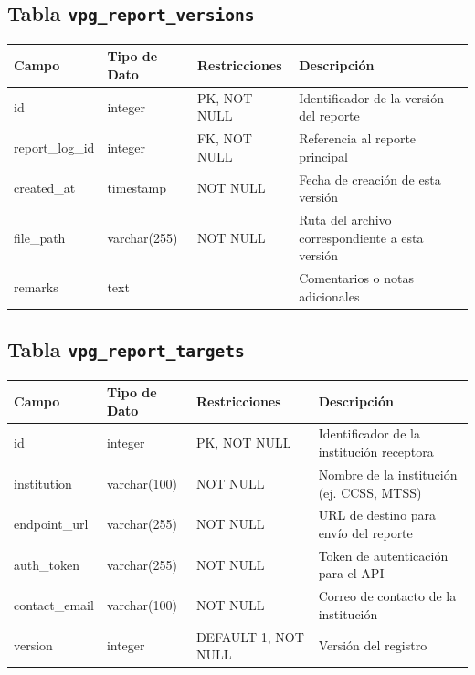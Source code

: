 \begin{center}
	\subsection{Tabla \texttt{vpg\_report\_versions}}
	\small
	\begin{tabular}{|l|l|l|p{6cm}|}
		\hline
		\textbf{Campo}  & \textbf{Tipo de Dato} & \textbf{Restricciones} & \textbf{Descripción}                            \\
		\hline
		id              & integer               & PK, NOT NULL           & Identificador de la versión del reporte         \\
		report\_log\_id & integer               & FK, NOT NULL           & Referencia al reporte principal                 \\
		created\_at     & timestamp             & NOT NULL               & Fecha de creación de esta versión               \\
		file\_path      & varchar(255)          & NOT NULL               & Ruta del archivo correspondiente a esta versión \\
		remarks         & text                  &                        & Comentarios o notas adicionales                 \\
		\hline
	\end{tabular}
	\normalsize

	\subsection{Tabla \texttt{vpg\_report\_targets}}
	\small
	\begin{tabular}{|l|l|l|p{6cm}|}
		\hline
		\textbf{Campo} & \textbf{Tipo de Dato} & \textbf{Restricciones} & \textbf{Descripción}                      \\
		\hline
		id             & integer               & PK, NOT NULL           & Identificador de la institución receptora \\
		institution    & varchar(100)          & NOT NULL               & Nombre de la institución (ej. CCSS, MTSS) \\
		endpoint\_url  & varchar(255)          & NOT NULL               & URL de destino para envío del reporte     \\
		auth\_token    & varchar(255)          & NOT NULL               & Token de autenticación para el API        \\
		contact\_email & varchar(100)          & NOT NULL               & Correo de contacto de la institución      \\
		version        & integer               & DEFAULT 1, NOT NULL    & Versión del registro                      \\
		\hline
	\end{tabular}
	\normalsize
\end{center}

